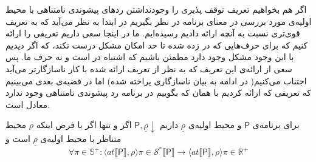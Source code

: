 اگر هم بخواهیم تعریف توقف پذیری را وجودنداشتن ردهای پیشوندی نامتناهی با محیط اولیه‌ی مورد بررسی در معنای برنامه در نظر بگیریم در ابتدا به نظر می‌آید که به تعریف قوی‌تری نسبت به آنچه ارائه دادیم رسیده‌ایم. ما در اینجا سعی داریم تعریفی را ارائه کنیم که برای حرف‌هایی که در \cite{calcul} زده شده تا حد امکان مشکل درست نکند، که اگر دیدیم با این وجود مشکل وجود دارد مطمئن باشیم که اشتباه در \cite{calcul} است و نه حرف ما. پس سعی از ارائه‌ی این تعریف که به نظر از تعریف ارائه شده با کار ناسازگارتر می‌آید اجتناب می‌کنیم( در ادامه به بیان ناسازگاری پراخته شده) اما در قضیه‌ی بعدی می‌بینیم که تعریفی که ارائه کردیم با همان که بگوییم در برنامه رد پیشوندی نامتناهی وجود ندارد معادل است.
\begin{thm}
	برای برنامه‌ی $\mathsf{P}$ و محیط اولیه‌ی $\underline{\rho}$ داریم $\mathsf{P} , \underline{\rho} \downarrow $ اگر و تنها اگر با فرض اینکه $\rho$ محیط متناظر با محیط اولیه‌ی $\underline{\rho}$ است و
	$$\forall \pi \in \mathbb{S^{+}} : 
	\langle at \llbracket \mathsf{P} \rrbracket , \rho \rangle \pi \in \mathcal{S^*} \llbracket \mathsf{P} \rrbracket \rightarrow
	\langle at \llbracket \mathsf{P} \rrbracket , \rho \rangle \pi \in \mathbb{R^+}$$
	 
\end{thm}
